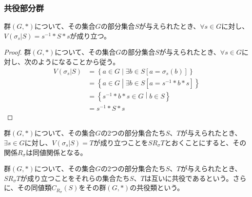\documentclass[dvipdfmx]{jsarticle}
\begin{document}
\subsubsection{共役部分群}%
\begin{thm}\label{3.1.3.9}
群$(G,*)$について、その集合$G$の部分集合$S$が与えられたとき、$\forall s \in G$に対し、$V\left( \sigma_{s}|S \right) = s^{- 1}*S*s$が成り立つ。
\end{thm}
\begin{proof}
群$(G,*)$について、その集合$G$の部分集合$S$が与えられたとき、$\forall s \in G$に対し、次のようになることから従う。
\begin{align*}
V\left( \sigma_{s}|S \right) &= \left\{ a \in G \middle| \exists b \in S\left\lbrack a = \sigma_{s}(b) \right\rbrack \right\}\\
&= \left\{ a \in G \middle| \exists b \in S\left\lbrack a = s^{- 1}*b*s \right\rbrack \right\}\\
&= \left\{ s^{- 1}*b*s \in G \middle| b \in S \right\}\\
&= s^{- 1}*S*s
\end{align*}
\end{proof}
\begin{thm}\label{3.1.3.10}
群$(G,*)$について、その集合$G$の2つの部分集合たち$S$、$T$が与えられたとき、$\exists s \in G$に対し、$V\left( \sigma_{s}|S \right) = T$が成り立つことを$SR_{\sigma}T$とおくことにすると、その関係$R_{\sigma}$は同値関係となる。
\end{thm}
\begin{dfn}
群$(G,*)$について、その集合$G$の2つの部分集合たち$S$、$T$が与えられたとき、$SR_{\sigma}T$が成り立つことをそれらの集合たち$S$、$T$は互いに共役であるという。さらに、その同値類$C_{R_{\sigma}}(S)$をその群$(G,*)$の共役類という。
\end{dfn}
\end{document}
